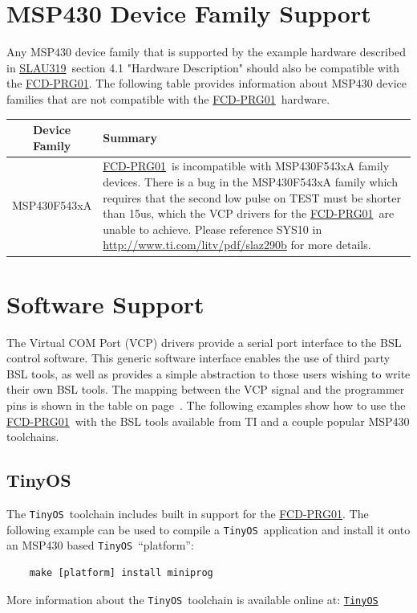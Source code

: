 \documentclass[10pt,letterpaper]{datasheet}
\newcommand{\PIDNOLINK}{FCD\nobreakdash-PRG01}
\newcommand{\PID}{\href{http://www.flyingcampdesign.com/msp430-bsl-programmer.html}{\PIDNOLINK}}
\newcommand{\tos}{\texttt{TinyOS}}
\newcommand{\tosurl}{\href{http://tinyos.net/}{\tos}}
\newcommand{\SLAUNOLINK}{SLAU319}
\newcommand{\SLAUPDF}{\href{http://www.ti.com/lit/pdf/SLAU319}{\SLAUNOLINK}}
\begin{document}
\newpage

\section*{MSP430 Device Family Support}
\begin{flushleft}
    Any MSP430 device family that is supported by the example hardware described in \SLAUPDF\ section 4.1 "Hardware Description" should also be compatible with the \PID.  The following table provides information about MSP430 device families that are not compatible with the \PID\ hardware.
\end{flushleft}
\label{tab:msp430-device-support}
\begin{tabularx}{\textwidth}{|c|X|}
  \hline
  Device Family &
  Summary \\
  \hline
  MSP430F543xA & \PID\ is incompatible with MSP430F543xA family devices.  There is a bug in the MSP430F543xA family which requires that the second low pulse on TEST must be shorter than 15us, which the VCP drivers for the \PID\ are unable to achieve. Please reference SYS10 in \href{http://www.ti.com/litv/pdf/slaz290b}{http://www.ti.com/litv/pdf/slaz290b} for more details.\\
  \hline
\end{tabularx}

\newpage

\section*{Software Support}
\begin{flushleft}
The Virtual COM Port (VCP) drivers provide a serial port interface to the BSL control software.  This generic software interface enables the use of third party BSL tools, as well as provides a simple abstraction to those users wishing to write their own BSL tools.  The mapping between the VCP signal and the programmer pins is shown in the table on page~\pageref{tab:pinout}.  The following examples show how to use the \PID\ with the BSL tools available from TI and a couple popular MSP430 toolchains.

\subsection*{TinyOS}
The \tos\ toolchain includes built in support for the \PID.  The following example can be used to compile a \tos\ application and install it onto an MSP430 based \tos\ ``platform'':
\begin{verbatim}
    make [platform] install miniprog
\end{verbatim}
More information about the \tos\ toolchain is available online at: \tosurl
\end{flushleft}
\end{document}
